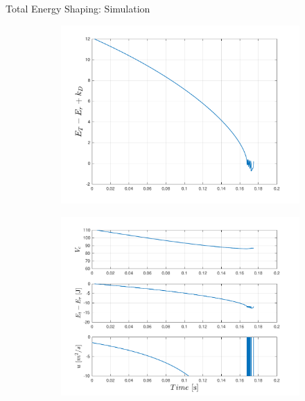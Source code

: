 \documentclass[10pt]{beamer}
\begin{document}
  \begin{frame}{Total Energy Shaping: Simulation}
    \begin{figure}
      \caption*{The controller encountered a
        singular point for initial state $(\theta(0),l(0),\dot{\theta}(0),
        \dot{l}(0)) = (-\pi/6,2,0,4)$}
      \vspace{-0.3cm}
      \begin{subfigure}{.49\textwidth}
        \includegraphics[width=1\linewidth]{images/total_2.pdf}
      \end{subfigure}
      \begin{subfigure}{.49\textwidth}
        \includegraphics[width=1\linewidth]{images/total_1.pdf}
      \end{subfigure}  
    \end{figure}
  \end{frame}
  
\end{document}
